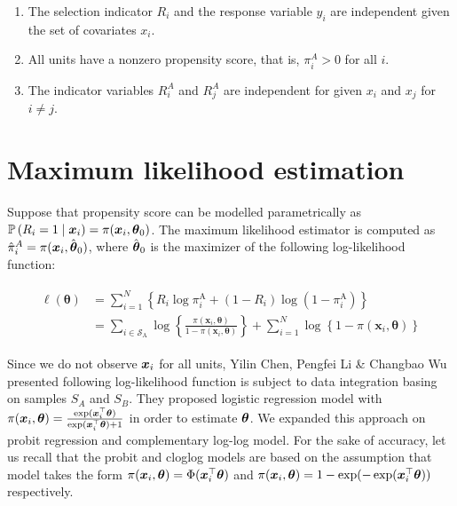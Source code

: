 \documentclass[
  letterpaper,
  DIV=11,
  numbers=noendperiod]{scrreprt}
\begin{document}
\begin{enumerate}
\def\labelenumi{\arabic{enumi}.}
\item
  The selection indicator \(R_i\) and the response variable \(y_i\) are
  independent given the set of covariates \(x_i\).
\item
  All units have a nonzero propensity score, that is, \(\pi_i^A > 0\)
  for all \(i\).
\item
  The indicator variables \(R_i^A\) and \(R_j^A\) are independent for
  given \(x_i\) and \(x_j\) for \(i \neq j\).
\end{enumerate}

\hypertarget{maximum-likelihood-estimation}{%
\section{Maximum likelihood
estimation}\label{maximum-likelihood-estimation}}

Suppose that propensity score can be modelled parametrically as
\(\mathbb{P}\left(R_i=1 \mid \boldsymbol{x}_i\right) = \pi(\boldsymbol{x}_{i}, \boldsymbol{\theta}_{0})\).
The maximum likelihood estimator is computed as
\(\hat{\pi}_{i}^{A} = \pi(\boldsymbol{x}_{i}, \hat{\boldsymbol{\theta}}_{0})\), where
\(\hat{\boldsymbol{\theta}}_{0}\) is the maximizer of the following log-likelihood
function:

\[
\begin{align}
    \begin{split}
 \ell(\boldsymbol{\theta}) & =\sum_{i=1}^N\left\{R_i \log \pi_i^{\mathrm{A}}+\left(1-R_i\right) \log \left(1-\pi_i^{\mathrm{A}}\right)\right\} \\ & =\sum_{i \in \mathcal{S}_{\mathrm{A}}} \log \left\{\frac{\pi\left(\boldsymbol{x}_i, \boldsymbol{\theta}\right)}{1-\pi\left(\boldsymbol{x}_i, \boldsymbol{\theta}\right)}\right\}+\sum_{i=1}^N \log \left\{1-\pi\left(\boldsymbol{x}_i, \boldsymbol{\theta}\right)\right\}
    \end{split}
\end{align}
\]

Since we do not observe \(\boldsymbol{x}_i\) for all units, Yilin Chen, Pengfei Li
\& Changbao Wu presented following log-likelihood function is subject to
data integration basing on samples \(S_A\) and \(S_B\). They proposed
logistic regression model with
\(\pi(\boldsymbol{x}_{i}, \boldsymbol{\theta}) = \frac{\exp(\boldsymbol{x}_{i}^{\top}\boldsymbol{\theta})}{\exp(\boldsymbol{x}_{i}^{\top}\boldsymbol{\theta}) + 1}\)
in order to estimate \(\boldsymbol{\theta}\). We expanded this approach on probit
regression and complementary log-log model. For the sake of accuracy,
let us recall that the probit and cloglog models are based on the
assumption that model takes the form
\(\pi(\boldsymbol{x}_{i},\boldsymbol{\theta}) = \Phi(\boldsymbol{x}_{i}^{\top}\boldsymbol{\theta})\) and
\(\pi(\boldsymbol{x}_{i}, \boldsymbol{\theta}) = 1 - \exp(-\exp(\boldsymbol{x}_{i}^{\top}\boldsymbol{\theta}))\)
respectively.
\end{document}
